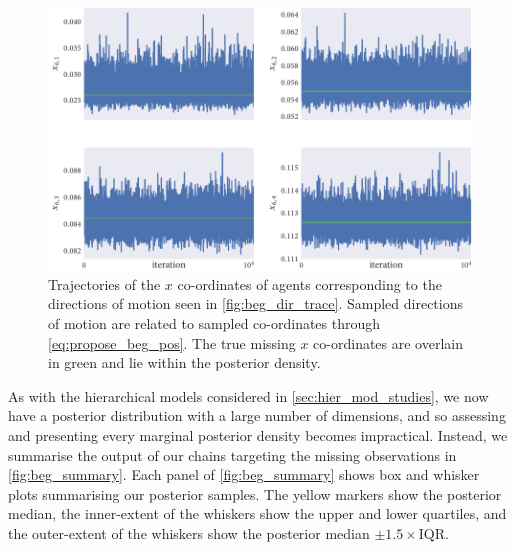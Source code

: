 \begin{figure}[tbp]
  \includegraphics{beg/x_trace.pdf}
  \caption{Trajectories of the $x$ co-ordinates of agents corresponding to the
  directions of motion seen in \cref{fig:beg_dir_trace}. Sampled directions of
  motion are related to sampled co-ordinates through \cref{eq:propose_beg_pos}.
  The true missing $x$ co-ordinates are overlain in green and lie within the
  posterior density.}
  \label{fig:beg_x_trace}
\end{figure}

As with the hierarchical models considered in \cref{sec:hier_mod_studies}, we
now have a posterior distribution with a large number of dimensions, and so
assessing and presenting every marginal posterior density becomes impractical.
Instead, we summarise the output of our chains targeting the missing
observations in \cref{fig:beg_summary}. Each panel of \cref{fig:beg_summary}
shows box and whisker plots summarising our posterior samples. The yellow
markers show the posterior median, the inner-extent of the whiskers show the
upper and lower quartiles, and the outer-extent of the whiskers show the
posterior median $\pm1.5\times\text{IQR}$.

